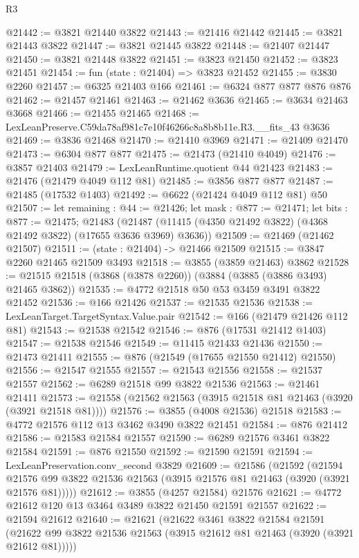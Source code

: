 \begin{lexlean}{R3}
\begin{coremodule}
@21442 := @3821 @21440 @3822
@21443 := @21416 @21442
@21445 := @3821 @21443 @3822
@21447 := @3821 @21445 @3822
@21448 := @21407 @21447
@21450 := @3821 @21448 @3822
@21451 := @3823 @21450
@21452 := @3823 @21451
@21454 := fun (state : @21404) => @3823 @21452
@21455 := @3830 @2260
@21457 := @6325 @21403 @166
@21461 := @6324 @877 @877 @876 @876
@21462 := @21457 @21461
@21463 := @21462 @3636
@21465 := @3634 @21463 @3668
@21466 := @21455 @21465
@21468 := LexLeanPreserve.C59da78af981c7e10f46266c8a8b8b11e.R3.__fits_43 @3636
@21469 := @3836 @21468
@21470 := @21410 @3969
@21471 := @21409 @21470
@21473 := @6304 @877 @877
@21475 := @21473 (@21410 @4049)
@21476 := @3857 @21403
@21479 := LexLeanRuntime.quotient @44 @21423
@21483 := @21476 (@21479 @4049 @112 @81)
@21485 := @3856 @877 @877
@21487 := @21485 (@17532 @1403)
@21492 := @6622 (@21424 @4049 @112 @81) @50
@21507 := let remaining : @44 := @21426;
  let mask : @877 := @21471;
  let bits : @877 := @21475;
  @21483 (@21487 (@11415 (@4350 @21492 @3822) (@4368 @21492 @3822) (@17655 @3636 @3969) @3636))
@21509 := @21469 (@21462 @21507)
@21511 := (state : @21404) -> @21466 @21509
@21515 := @3847 @2260 @21465 @21509 @3493
@21518 := @3855 (@3859 @21463) @3862
@21528 := @21515 @21518 (@3868 (@3878 @2260)) (@3884 (@3885 (@3886 @3493) @21465 @3862))
@21535 := @4772 @21518 @50 @53 @3459 @3491 @3822 @21452
@21536 := @166 @21426
@21537 := @21535 @21536
@21538 := LexLeanTarget.TargetSyntax.Value.pair
@21542 := @166 (@21479 @21426 @112 @81)
@21543 := @21538 @21542
@21546 := @876 (@17531 @21412 @1403)
@21547 := @21538 @21546
@21549 := @11415 @21433 @21436
@21550 := @21473 @21411
@21555 := @876 (@21549 (@17655 @21550 @21412) @21550)
@21556 := @21547 @21555
@21557 := @21543 @21556
@21558 := @21537 @21557
@21562 := @6289 @21518 @99 @3822 @21536
@21563 := @21461 @21411
@21573 := @21558 (@21562 @21563 (@3915 @21518 @81 @21463 (@3920 (@3921 @21518 @81))))
@21576 := @3855 (@4008 @21536) @21518
@21583 := @4772 @21576 @112 @13 @3462 @3490 @3822 @21451
@21584 := @876 @21412
@21586 := @21583 @21584 @21557
@21590 := @6289 @21576 @3461 @3822 @21584
@21591 := @876 @21550
@21592 := @21590 @21591
@21594 := LexLeanPreservation.conv_second @3829
@21609 := @21586
    (@21592
      (@21594 @21576 @99 @3822 @21536 @21563 (@3915 @21576 @81 @21463 (@3920 (@3921 @21576 @81)))))
@21612 := @3855 (@4257 @21584) @21576
@21621 := @4772 @21612 @120 @13 @3464 @3489 @3822 @21450 @21591 @21557
@21622 := @21594 @21612
@21640 := @21621
    (@21622
      @3461
      @3822
      @21584
      @21591
      (@21622 @99 @3822 @21536 @21563 (@3915 @21612 @81 @21463 (@3920 (@3921 @21612 @81)))))

\end{coremodule}
\end{lexlean}
